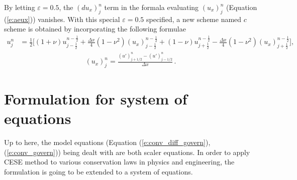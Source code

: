 \documentclass[11pt,dvips]{article}
\numberwithin{equation}{section}
\begin{document}
By letting $\varepsilon=0.5$, the $(du_x)_j^n$ term in the formala evaluating
$(u_x)_j^n$ (Equation (\ref{e:aeux})) vanishes.  With this special
$\varepsilon=0.5$ specified, a new scheme named $c$ scheme is obtained by
incorporating the following formulae
\begin{align}
  u_j^n &= \frac{1}{2}\Big[
      (1+\nu)u_{j-\frac{1}{2}}^{n-\frac{1}{2}}
    + \frac{\Delta x}{4}(1-\nu^2)(u_x)_{j-\frac{1}{2}}^{n-\frac{1}{2}}
    + (1-\nu)u_{j+\frac{1}{2}}^{n-\frac{1}{2}}
    - \frac{\Delta x}{4}(1-\nu^2)(u_x)_{j+\frac{1}{2}}^{n-\frac{1}{2}}
  \Big], \label{e:cu}
\end{align}
\begin{align}
  (u_x)_j^n = \frac{(u')_{j+1/2}^n - (u')_{j-1/2}^n}{\Delta x}
  \,. \label{e:cux}
\end{align}

\section{Formulation for system of equations}
\label{s:system_eqn}

Up to here, the model equations (Equation (\ref{e:conv_diff_govern}),
(\ref{e:conv_govern})) being dealt with are both scaler equations.
In order to apply CESE method to various conservation laws in physics
and engineering, the formulation is going to be extended to a system
of equations.
\end{document}
